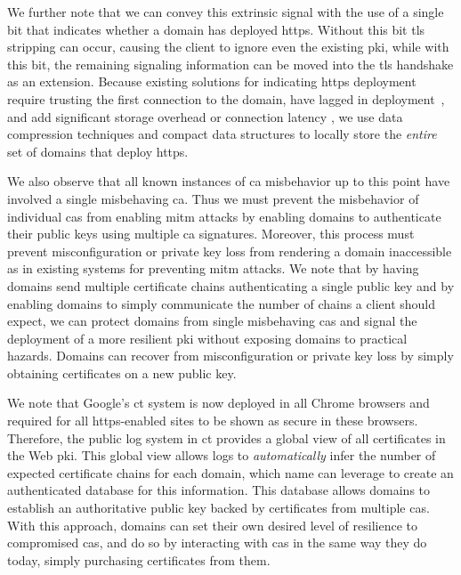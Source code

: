 We further note that we can convey this extrinsic signal with the use of a
single bit that indicates whether a domain has deployed \ac{https}. Without this
bit \ac{tls} stripping can occur, causing the client to ignore even the existing
\ac{pki}, while with this bit, the remaining signaling information can be moved
into the \ac{tls} handshake as an extension. Because existing solutions for
indicating \ac{https} deployment require trusting the first connection to the
domain, have lagged in deployment~\cite{rfc4033}, and add significant storage
overhead  or connection latency , we
use data compression techniques and compact data structures to locally store the
\emph{entire} set of domains that deploy \ac{https}.

We also observe that all known instances of \ac{ca} misbehavior up to this point
have involved a single misbehaving \ac{ca}. Thus we must prevent the misbehavior
of individual \acp{ca} from enabling \ac{mitm} attacks by enabling domains to
authenticate their public keys using multiple \ac{ca} signatures. Moreover, this
process must prevent misconfiguration or private key loss from rendering a
domain inaccessible as in existing systems for preventing \ac{mitm} attacks. We
note that by having domains send multiple certificate chains authenticating a
single public key and by enabling domains to simply communicate the number of
chains a client should expect, we can protect domains from single misbehaving
\acp{ca} and signal the deployment of a more resilient \ac{pki} without exposing
domains to practical hazards. Domains can recover from misconfiguration or
private key loss by simply obtaining certificates on a new public key.

We note that Google's \ac{ct} system is now deployed in all Chrome browsers and
required for all \ac{https}-enabled sites to be shown as secure in these
browsers. Therefore, the public log system in \ac{ct} provides a global view of
all certificates in the Web \ac{pki}. This global view allows logs to
\emph{automatically} infer the number of expected certificate chains for each
domain, which \ac{name} can leverage to create an authenticated database for
this information. This database allows domains to establish an authoritative
public key backed by certificates from multiple \acp{ca}. With this approach,
domains can set their own desired level of resilience to compromised \acp{ca},
and do so by interacting with \acp{ca} in the same way they do today, simply
purchasing certificates from them.

